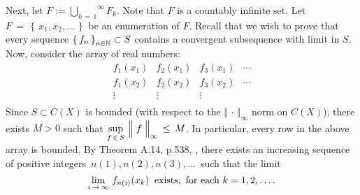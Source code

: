 \vskip 0.3cm
\noindent
Next, let $F := \overset{\infty}{\underset{k\,=\,1}{\bigcup}}F_{k}$.
Note that $F$ is a countably infinite set.
Let $F \,=\, \left\{\,x_{1},x_{2},\ldots\,\right\}$ be an enumeration of $F$.
Recall that we wish to prove that every sequence
$\left\{\,f_{n}\,\right\}_{n\in\mathbb{N}} \subset S$ contains a convergent subsequence
with limit in $S$.
Now, consider the array of real numbers:
\begin{equation*}
\begin{array}{cccc}
f_{1}(x_{1}) & f_{2}(x_{1}) & f_{3}(x_{1}) & \cdots \\
f_{1}(x_{2}) & f_{2}(x_{2}) & f_{3}(x_{2}) & \cdots \\
\vdots & \vdots & \vdots & \\
\end{array}
\end{equation*}
Since $S \subset C(X)$ is bounded (with respect to the $\Vert\,\cdot\,\Vert_{\infty}$ norm on $C(X)$),
there exists $M > 0$ such that
$\underset{f\,\in\,S}{\sup}\,\left\Vert\;\overset{{\color{white}.}}{f}\;\right\Vert_{\infty} \,\leq\, M$.
In particular, every row in the above array is bounded.
By Theorem A.14, p.538, \cite{Billingsley1995}, there exists an increasing sequence
of positive integers \,$n(1), n(2), n(3), \ldots$\, such that the limit
\begin{equation*}
\lim_{i\,\rightarrow\,\infty}\,f_{n(i)}(x_{k})
\;\;\textnormal{exists,\, for each $k = 1, 2, \ldots$\,}.
\end{equation*}

